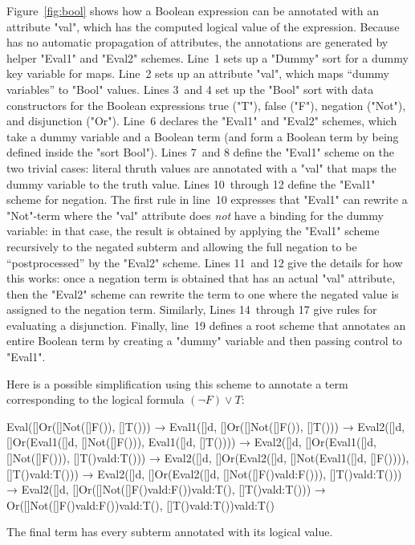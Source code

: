 \documentclass[letterpaper,11pt]{article}
\begin{document}
\begin{example}\label{ex:bool}
  Figure~\ref{fig:bool} shows how a Boolean expression can be annotated with an attribute "val",
  which has the computed logical value of the expression. Because \hax has no automatic propagation
  of attributes, the annotations are generated by helper "Eval1" and "Eval2" schemes.
  Line~1 sets up a "Dummy" sort for a dummy key variable for maps. %
  Line~2 sets up an attribute "val", which maps ``dummy variables'' to "Bool" values. %
  Lines 3~and 4 set up the "Bool" sort with data constructors for the Boolean expressions true
  ("T"), false ("F"), negation ("Not"), and disjunction ("Or"). %
  Line~6 declares the "Eval1" and "Eval2" schemes, which take a dummy variable and a Boolean term
  (and form a Boolean term by being defined inside the "sort Bool").  %
  Lines 7~and 8 define the "Eval1" scheme on the two trivial cases: literal thruth values are
  annotated with a "val" that maps the dummy variable to the truth value. %
  Lines 10~through 12 define the "Eval1" scheme for negation. %
  The first rule in line~10 expresses that "Eval1" can rewrite a "Not"-term where the "val"
  attribute does \emph{not} have a binding for the dummy variable: in that case, the result is
  obtained by applying the "Eval1" scheme recursively to the negated subterm and allowing the full
  negation to be ``postprocessed'' by the "Eval2" scheme. %
  Lines 11~and 12 give the details for how this works: once a negation term is obtained that has an
  actual "val" attribute, then the "Eval2" scheme can rewrite the term to one where the negated
  value is assigned to the negation term. %
  Similarly, Lines 14~through 17 give rules for evaluating a disjunction. %
  Finally, line~19 defines a root scheme that annotates an entire Boolean term by creating a "dummy"
  variable and then passing control to "Eval1".

  Here is a possible simplification using this scheme to annotate a term corresponding to the
  logical formula $(¬F)∨T$:
  \begin{hacs}
    Eval([]Or([]Not([]F()), []T()))
    → Eval1([]d, []Or([]Not([]F()), []T()))
    → Eval2([]d, []Or(Eval1([]d, []Not([]F())), Eval1([]d, []T())))
    → Eval2([]d, []Or(Eval1([]d, []Not([]F())), []T()val{d:T()}))
    → Eval2([]d, []Or(Eval2([]d, []Not(Eval1([]d, []F()))), []T()val{d:T()}))
    → Eval2([]d, []Or(Eval2([]d, []Not([]F()val{d:F()})), []T()val{d:T()}))
    → Eval2([]d, []Or([]Not([]F()val{d:F()})val{d:T()}, []T()val{d:T()}))
    → Or([]Not([]F()val{d:F()})val{d:T()}, []T()val{d:T()})val{d:T()}
  \end{hacs}%
  The final term has every subterm annotated with its logical value.


\end{example}
\end{document}
